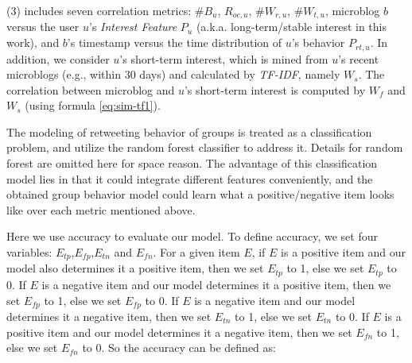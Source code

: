 	\stab(3)  includes seven correlation metrics: \#$B_u$, $R_{oc,u}$, \#$W_{r,u}$, \#$W_{t,u}$, microblog $b$ versus the user $u$'s \textit{Interest Feature} $P_u$ (a.k.a. long-term/stable interest in this work), and $b$'s timestamp versus the time distribution of $u$'s \retg{} behavior $P_{rt,u}$.
In addition, we consider $u$'s short-term interest, which is mined from $u$'s recent microblogs (e.g., within 30 days) and calculated by \textit{TF-IDF}, namely $W_s$.
The correlation between microblog and $u$'s short-term interest is computed by $W_f$ and $W_s$ (using formula \ref{eq:sim-tf1}).

The modeling of retweeting behavior of groups is treated as a classification problem, and utilize the random forest classifier to address it. Details for random forest \cite{IEEEexample:conf/icdar/Ho1995} are omitted here for space reason.
The advantage of this classification model lies in that it could integrate different features conveniently, and
the obtained group behavior model could learn what a positive/negative item looks like over each metric mentioned above. \par
Here we use accuracy to evaluate our model. To define accuracy, we set four variables: $E_{tp}$,$E_{fp}$,$E_{tn}$ and $E_{fn}$. For a given item $E$, if $E$ is a positive item and our model also determines it a positive item, then we set $E_{tp}$ to 1, else we set $E_{tp}$ to 0. If $E$ is a negative item and our model determines it a positive item, then we set $E_{fp}$ to 1, else we set $E_{fp}$ to 0. If $E$ is a negative item and our model determines it a negative item, then we set $E_{tn}$ to 1, else we set $E_{tn}$ to 0. If $E$ is a positive item and our model determines it a negative item, then we set $E_{fn}$ to 1, else we set $E_{fn}$ to 0. So the accuracy can be defined as:


